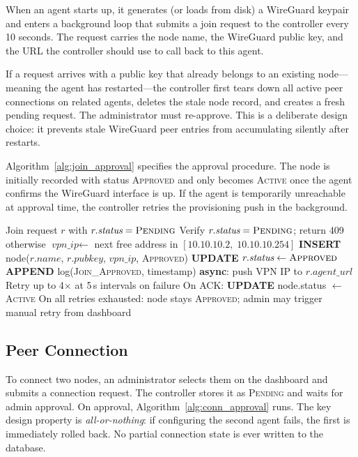 \documentclass[conference]{IEEEtran}
\begin{document}
When an agent starts up, it generates (or loads from disk) a WireGuard
keypair and enters a background loop that submits a join request to the
controller every 10 seconds. The request carries the node name, the
WireGuard public key, and the URL the controller should use to call back
to this agent.

If a request arrives with a public key that already belongs to an
existing node---meaning the agent has restarted---the controller first
tears down all active peer connections on related agents, deletes the stale
node record, and creates a fresh pending request. The administrator must
re-approve. This is a deliberate design choice: it prevents stale WireGuard
peer entries from accumulating silently after restarts.

Algorithm~\ref{alg:join_approval} specifies the approval procedure. The
node is initially recorded with status \textsc{Approved} and only becomes
\textsc{Active} once the agent confirms the WireGuard interface is up.
If the agent is temporarily unreachable at approval time, the controller
retries the provisioning push in the background.

\begin{algorithm}[!t]
\caption{Node Enrollment Approval}
\label{alg:join_approval}
\begin{algorithmic}[1]
\REQUIRE Join request $r$ with $r.\textit{status} = \textsc{Pending}$
\STATE Verify $r.\textit{status} = \textsc{Pending}$; return 409 otherwise
\STATE $\textit{vpn\_ip} \leftarrow$ next free address in $[10.10.10.2,\;10.10.10.254]$
\STATE \textbf{INSERT} node($r.\textit{name}$, $r.\textit{pubkey}$,
       $\textit{vpn\_ip}$, \textsc{Approved})
\STATE \textbf{UPDATE} $r.\textit{status} \leftarrow \textsc{Approved}$
\STATE \textbf{APPEND} log(\textsc{Join\_Approved}, timestamp)
\STATE \textbf{async}: push VPN IP to $r.\textit{agent\_url}$
\STATE \quad Retry up to 4$\times$ at 5\,s intervals on failure
\STATE \quad On ACK: \textbf{UPDATE} node.status $\leftarrow$ \textsc{Active}
\STATE \quad On all retries exhausted: node stays \textsc{Approved};
       admin may trigger manual retry from dashboard
\end{algorithmic}
\end{algorithm}

\subsection{Peer Connection}

To connect two nodes, an administrator selects them on the dashboard and
submits a connection request. The controller stores it as \textsc{Pending}
and waits for admin approval. On approval, Algorithm~\ref{alg:conn_approval}
runs. The key design property is \emph{all-or-nothing}: if configuring the
second agent fails, the first is immediately rolled back. No partial connection
state is ever written to the database.
\end{document}

